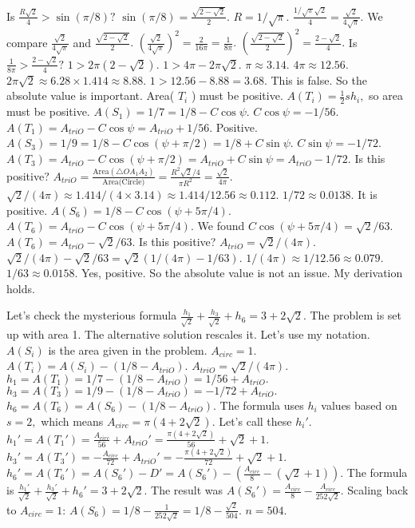 Is $\frac{R\sqrt{2}}{4} > \sin(\pi/8)?$ $\sin(\pi/8) = \frac{\sqrt{2-\sqrt{2}}}{2}.$ $R=1/\sqrt{\pi}.$ $\frac{1/\sqrt{\pi} \sqrt{2}}{4} = \frac{\sqrt{2}}{4\sqrt{\pi}}.$ We compare $\frac{\sqrt{2}}{4\sqrt{\pi}}$ and $\frac{\sqrt{2-\sqrt{2}}}{2}.$ 
$(\frac{\sqrt{2}}{4\sqrt{\pi}})^2 = \frac{2}{16\pi} = \frac{1}{8\pi}.$ $(\frac{\sqrt{2-\sqrt{2}}}{2})^2 = \frac{2-\sqrt{2}}{4}.$ 
Is $\frac{1}{8\pi} > \frac{2-\sqrt{2}}{4}?$ $1 > 2\pi(2-\sqrt{2}).$ $1 > 4\pi - 2\pi\sqrt{2}.$ $\pi \approx 3.14.$ $4\pi \approx 12.56.$ $2\pi\sqrt{2} \approx 6.28 \times 1.414 \approx 8.88.$ $1 > 12.56 - 8.88 = 3.68.$ This is false. 
So the absolute value is important. Area( $T_i$ ) must be positive. 
$A(T_i) = \frac{1}{2} s h_i,$ so area must be positive. 
$A(S_1) = 1/7 = 1/8 - C \cos \psi.$ $C \cos \psi = -1/56.$ $A(T_1) = A_{triO} - C \cos \psi = A_{triO} + 1/56.$ Positive. 
$A(S_3) = 1/9 = 1/8 - C \cos(\psi+\pi/2) = 1/8 + C \sin \psi.$ $C \sin \psi = -1/72.$ $A(T_3) = A_{triO} - C \cos(\psi+\pi/2) = A_{triO} + C \sin \psi = A_{triO} - 1/72.$ Is this positive? $A_{triO} = \frac{\text{Area}(\triangle OA_1A_2)}{\text{Area(Circle)}} = \frac{R^2\sqrt{2}/4}{\pi R^2} = \frac{\sqrt{2}}{4\pi}.$ $\sqrt{2}/(4\pi) \approx 1.414 / (4 \times 3.14) \approx 1.414 / 12.56 \approx 0.112.$ $1/72 \approx 0.0138.$ It is positive. 
$A(S_6) = 1/8 - C \cos(\psi+5\pi/4).$ $A(T_6) = A_{triO} - C \cos(\psi+5\pi/4).$ We found $C \cos(\psi+5\pi/4) = \sqrt{2}/63.$ 
$A(T_6) = A_{triO} - \sqrt{2}/63.$ Is this positive? $A_{triO} = \sqrt{2}/(4\pi).$ $\sqrt{2}/(4\pi) - \sqrt{2}/63 = \sqrt{2} (1/(4\pi) - 1/63).$ $1/(4\pi) \approx 1/12.56 \approx 0.079.$ $1/63 \approx 0.0158.$ Yes, positive. 
So the absolute value is not an issue. My derivation holds.

Let's check the mysterious formula $\frac{h_1}{\sqrt{2}} + \frac{h_3}{\sqrt{2}} + h_6 = 3+2\sqrt{2}.$ 
The problem is set up with area 1. The alternative solution rescales it. 
Let's use my notation. $A(S_i)$ is the area given in the problem. $A_{circ}=1.$ 
$A(T_i) = A(S_i) - (1/8 - A_{triO}).$ 
$A_{triO} = \sqrt{2}/(4\pi).$ 
$h_1 = A(T_1) = 1/7 - (1/8 - A_{triO}) = 1/56 + A_{triO}.$ 
$h_3 = A(T_3) = 1/9 - (1/8 - A_{triO}) = -1/72 + A_{triO}.$ 
$h_6 = A(T_6) = A(S_6) - (1/8 - A_{triO}).$ 
The formula uses $h_i$ values based on $s=2,$ which means $A_{circ}=\pi(4+2\sqrt{2}).$ Let's call these $h_i'.$ 
$h_1' = A(T_1') = \frac{A_{circ}}{56} + A_{triO}' = \frac{\pi(4+2\sqrt{2})}{56} + \sqrt{2}+1.$ 
$h_3' = A(T_3') = -\frac{A_{circ}}{72} + A_{triO}' = -\frac{\pi(4+2\sqrt{2})}{72} + \sqrt{2}+1.$ 
$h_6' = A(T_6') = A(S_6') - D' = A(S_6') - (\frac{A_{circ}}{8} - (\sqrt{2}+1)).$ 
The formula is $\frac{h_1'}{\sqrt{2}} + \frac{h_3'}{\sqrt{2}} + h_6' = 3+2\sqrt{2}.$ 
The result was $A(S_6') = \frac{A_{circ}}{8} - \frac{A_{circ}}{252\sqrt{2}}.$ 
Scaling back to $A_{circ}=1$: $A(S_6) = 1/8 - \frac{1}{252\sqrt{2}} = 1/8 - \frac{\sqrt{2}}{504}.$ $n=504.$

